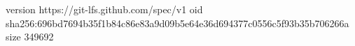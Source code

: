 version https://git-lfs.github.com/spec/v1
oid sha256:696bd7694b35f1b84c86e83a9d09b5e64e36d694377c0556c5f93b35b706266a
size 349692
